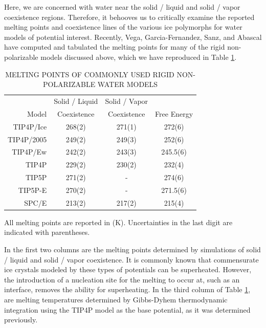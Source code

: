 Here, we are concerned with water near the solid / liquid and solid /
vapor coexistence regions. Therefore, it behooves us to critically
examine the reported melting points and coexistence lines of the
various ice polymorphs for water models of potential
interest. Recently, Vega, Garcia-Fernandez, Sanz, and Abascal have
computed and tabulated the melting points for many of the rigid
non-polarizable models discussed above, which we have reproduced in
Table
\ref{tab:meltingPoints}.\cite{Abascal2005,Abascal2005a,Vega2005,Vega2005a,Fernandez2006,Vega2006a}

\begin{table}[h]
\centering
\caption{MELTING POINTS OF COMMONLY USED RIGID NON-POLARIZABLE
        WATER MODELS \cite{Abascal2005,Abascal2005a,Vega2005,Vega2005a,Fernandez2006,Vega2006a}\label{tab:meltingPoints}} 
\begin{tabular}{rccc}
\hline \hline
& Solid / Liquid & Solid / Vapor & \\
Model & Coexistence & Coexistence & Free Energy \\
\hline
TIP4P/Ice & 268(2) & 271(1) & 272(6) \\
TIP4P/2005 & 249(2) & 249(3) & 252(6) \\
TIP4P/Ew & 242(2) & 243(3) & 245.5(6) \\
TIP4P & 229(2) & 230(2) & 232(4) \\
TIP5P & 271(2) & - & 274(6) \\
TIP5P-E & 270(2) & - & 271.5(6) \\
SPC/E & 213(2) & 217(2) & 215(4) \\
\hline \hline
\end{tabular}
\flushleft
All melting points are reported in (K). 
Uncertainties in the last digit are indicated with parentheses. \\
\end{table}

In the first two columns are the melting points determined by
simulations of solid / liquid and solid / vapor coexistence. It is
commonly known that commensurate ice crystals modeled by these types
of potentials can be superheated.\cite{Vega2006a} However, the
introduction of a nucleation site for the melting to occur at, such as
an interface, removes the ability for superheating. In the third
column of Table \ref{tab:meltingPoints}, are melting temperatures
determined by Gibbs-Dyhem thermodynamic integration\cite{Kofke1993}
using the TIP4P model as the base potential, as it was determined
previously.\cite{Sanz2004}

